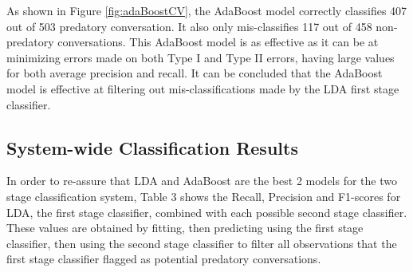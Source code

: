 \documentclass[11pt]{article}
\begin{document}
As shown in Figure \ref{fig:adaBoostCV}, the AdaBoost model correctly classifies 407 out of 503 predatory conversation. It also only mis-classifies 117 out of 458 non-predatory conversations. This AdaBoost model is as effective as it can be at minimizing errors made on both Type I and Type II errors, having large values for both average precision and recall. It can be concluded that the AdaBoost model is effective at filtering out mis-classifications made by the LDA first stage classifier. 

\subsection{System-wide Classification Results}
In order to re-assure that LDA and AdaBoost are the best 2 models for the two stage classification system, Table 3 shows the Recall, Precision and F1-scores for LDA, the first stage classifier, combined with each possible second stage classifier. These values are obtained by fitting, then predicting using the first stage classifier, then using the second stage classifier to filter all observations that the first stage classifier flagged as potential predatory conversations.
\end{document}
